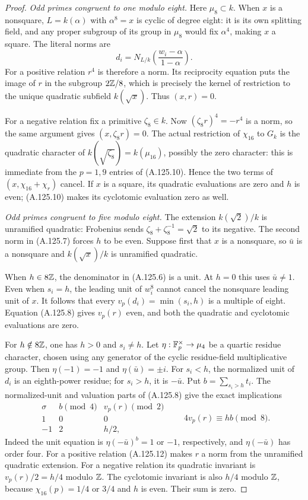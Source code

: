 \begin{proof}
\emph{Odd primes congruent to one modulo eight.}
Here $\mu_8\subset k$.
When $x$ is a nonsquare, $L=k(\alpha)$ with
$\alpha^8=x$ is cyclic of degree eight: it is its own
splitting field, and any proper subgroup of its group
in $\mu_8$ would fix $\alpha^4$, making $x$ a square.
The literal norms are
\[
 d_i=N_{L/k}\left(\frac{w_i-\alpha}{1-\alpha}\right).
\tag{A.125.11}
\]
For a positive relation $r^4$ is therefore a norm.
Its reciprocity equation puts the image of $r$ in the
subgroup $2\mathbb Z/8$, which is precisely the kernel of
restriction to the unique quadratic subfield
$k(\sqrt x)$.
Thus $(x,r)=0$.

For a negative relation fix a primitive $\zeta_8\in k$.
Now $(\zeta_8r)^4=-r^4$ is a norm, so the same argument
gives $(x,\zeta_8r)=0$.
The actual restriction of $\chi_{16}$ to $G_k$ is the
quadratic character of $k(\sqrt{\zeta_8})=k(\mu_{16})$,
possibly the zero character: this is immediate from
the $p=1,9$ entries of (A.125.10).
Hence the two terms of
$(x,\chi_{16}+\chi_r)$ cancel.
If $x$ is a square, its quadratic evaluations are zero
and $h$ is even; (A.125.10) makes its cyclotomic
evaluation zero as well.

\emph{Odd primes congruent to five modulo eight.}
The extension $k(\sqrt2)/k$ is unramified quadratic:
Frobenius sends
$\zeta_8+\zeta_8^{-1}=\sqrt2$ to its negative.
The second norm in (A.125.7) forces $h$ to be even.
Suppose first that $x$ is a nonsquare, so $\bar u$ is
a nonsquare and $k(\sqrt x)/k$ is unramified quadratic.

When $h\in8\mathbb Z$, the denominator in (A.125.6) is a
unit.  At $h=0$ this uses $\bar u\ne1$.
Even when $s_i=h$, the leading unit of $w_i^8$ cannot
cancel the nonsquare leading unit of $x$.
It follows that every $v_p(d_i)=\min(s_i,h)$ is a
multiple of eight.
Equation (A.125.8) gives $v_p(r)$ even, and both the
quadratic and cyclotomic evaluations are zero.

For $h\notin8\mathbb Z$, one has $h>0$ and $s_i\ne h$.
Let $\eta:\mathbb F_p^\times\to\mu_4$ be a quartic residue
character, chosen using any generator of the cyclic
residue-field multiplicative group.
Then $\eta(-1)=-1$ and $\eta(\bar u)=\pm i$.
For $s_i<h$, the normalized unit of $d_i$ is an
eighth-power residue; for $s_i>h$, it is $-\bar u$.
Put $b=\sum_{s_i>h}t_i$.
The normalized-unit and valuation parts of
(A.125.8) give the exact implications
\[
\begin{array}{c|c|c}
 \sigma&b\pmod4&v_p(r)\pmod2\\ \hline
 1&0&0\\
 -1&2&h/2,
\end{array}
 \qquad 4v_p(r)\equiv hb\pmod8.
\tag{A.125.12}
\]
Indeed the unit equation is
$\eta(-\bar u)^b=1$ or $-1$, respectively, and
$\eta(-\bar u)$ has order four.
For a positive relation (A.125.12) makes $r$ a norm
from the unramified quadratic extension.
For a negative relation its quadratic invariant is
$v_p(r)/2=h/4$ modulo $\mathbb Z$.
The cyclotomic invariant is also $h/4$ modulo $\mathbb Z$,
because $\chi_{16}(p)=1/4$ or $3/4$ and $h$ is even.
Their sum is zero.


\end{proof}

